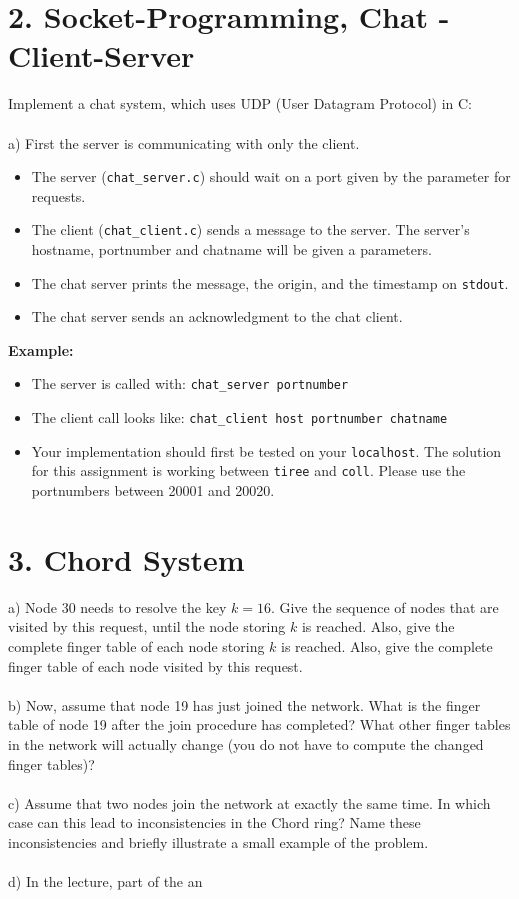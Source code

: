 \documentclass{article}
\begin{document}
\section*{2. Socket-Programming, Chat - Client-Server}

Implement a chat system, which uses UDP (User Datagram Protocol) in C:\\
\\
a) First the server is communicating with only the client.
\begin{itemize}
  \item The server (\texttt{chat_server.c}) should wait on a port given by the parameter for requests.\\
  \item The client (\texttt{chat_client.c}) sends a message to the server. The server's hostname, 
    portnumber and chatname will be given a parameters.\\
  \item The chat server prints the message, the origin, and the timestamp on \texttt{stdout}.\\
  \item The chat server sends an acknowledgment to the chat client.
\end{itemize}
\textbf{Example:}
\begin{itemize}
  \item The server is called with: \texttt{chat_server portnumber}\\
  \item The client call looks like: \texttt{chat_client host portnumber chatname}\\
  \item Your implementation should first be tested on your \texttt{localhost}. The solution for this
    assignment is working between \texttt{tiree} and \texttt{coll}. Please use the portnumbers between
    20001 and 20020.
\end{itemize}

\section*{3. Chord System}

a) Node 30 needs to resolve the key $k = 16$. Give the sequence of nodes that are visited by this request,
until the node storing $k$ is reached. Also, give the complete finger table of each node storing $k$ is
reached. Also, give the complete finger table of each node visited by this request.\\
\\
b) Now, assume that node 19 has just joined the network. What is the finger table of node 19 after the
join procedure has completed? What other finger tables in the network will actually change (you do not
have to compute the changed finger tables)?\\
\\
c) Assume that two nodes join the network at exactly the same time. In which case can this lead to
inconsistencies in the Chord ring? Name these inconsistencies and briefly illustrate a small example of
the problem.\\
\\
d) In the lecture, part of the an
\end{document}

